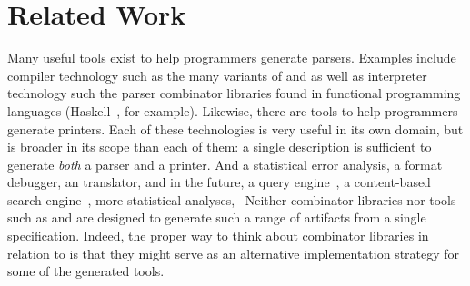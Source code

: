 \section{Related Work}
\label{sec:related}

Many useful tools exist to help programmers generate
parsers.  Examples include compiler technology such as the many
variants of \lex{} and \yacc{} as well as interpreter technology such the
parser combinator libraries found in functional programming languages
(Haskell~\cite{hutton+:parser-combinators}, for example).  Likewise,
there are tools to help programmers generate printers.  Each of these
technologies is very useful in its own domain, but \padsml{} is broader in its scope than each of them:
a single \padsml{} description is sufficient to generate \textit{both} a parser and a printer.  And a statistical error analysis, a format debugger, an \xml{}
translator, and in the future, a query engine~\cite{fernandez+:padx},
a content-based search engine~\cite{lv+:cbs,oh:siw}, more statistical
analyses, \etc\  Neither combinator libraries nor tools such as \lex{} and \yacc{} are designed to generate such a range of artifacts from a single specification.  Indeed, the proper way to think about combinator libraries in relation to \padsml{} is that they might serve as an alternative implementation strategy for some of the generated tools.




